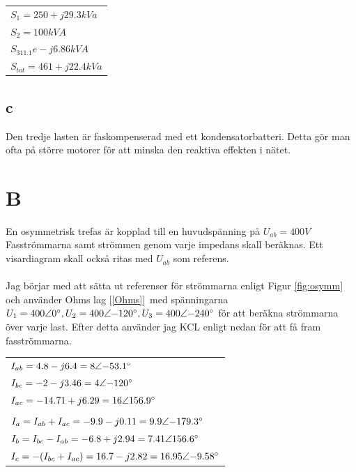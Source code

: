 \documentclass{article}
\begin{document}
  \begin{tabular}{l}
      $S_1=250 + j29.3 kVa$ \\
      $S_2=100kVA$ \\
      $S_311.1e - j6.86 kVA$\\
      $S_{tot}=461 + j22.4 kVa$
  \end{tabular}

\subsection{c}
Den tredje lasten är faskompenserad med ett kondensatorbatteri.
Detta gör man ofta på större motorer för att minska den reaktiva effekten i nätet.

\section{B}
  En osymmetrisk trefas är kopplad till en huvudspänning på $U_{ab}=400V$
  Fasströmmarna samt strömmen genom varje impedans skall beräknas.
  Ett visardiagram skall också ritas med $U_{ab}$ som referens.
  \\
  \\
  Jag börjar med att sätta ut referenser för strömmarna enligt Figur \ref{fig:osymm} och använder Ohms lag [\ref{Ohms}]\
   med spänningarna $U_1=400\angle{0\degree},U_2=400\angle{-120\degree},U_3=400\angle{-240\degree}$ för att beräkna strömmarna över varje last.
  Efter detta använder jag KCL enligt nedan för att få fram fasströmmarna.


  \begin{tabular}{| l}
    $I_{ab}=4.8-j6.4=8\angle{-53.1\degree}$\\
    $I_{bc}=-2-j3.46=4\angle{-120\degree}$\\
    $I_{ac}=-14.71+j6.29=16\angle{156.9\degree}$\\
    \\
    $I_a=I_{ab}+I_{ac}=-9.9-j0.11=9.9\angle{-179.3\degree}$\\
    $I_b=I_{bc}-I_{ab}=-6.8+j2.94=7.41\angle{156.6\degree}$\\
    $I_c=-(I_{bc}+I_{ac})=16.7-j2.82=16.95\angle{-9.58\degree}$\\
  \end{tabular}
\end{document}
